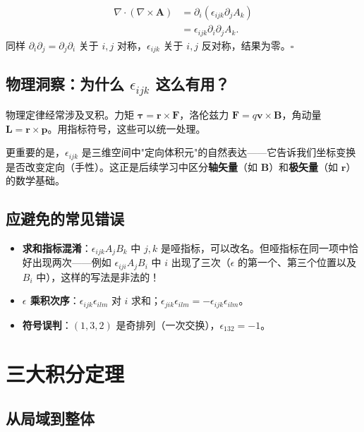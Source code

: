 \begin{example}[证明 $\nabla\cdot(\nabla\times\mathbf{A}) = 0$]
\begin{align*}
\nabla\cdot(\nabla\times\mathbf{A})
&= \partial_i(\epsilon_{ijk}\partial_j A_k) \\
&= \epsilon_{ijk}\partial_i\partial_j A_k.
\end{align*}
同样 $\partial_i\partial_j = \partial_j\partial_i$ 关于 $i,j$ 对称，$\epsilon_{ijk}$ 关于 $i,j$ 反对称，结果为零。$\square$
\end{example}

\subsection{物理洞察：为什么 \texorpdfstring{$\epsilon_{ijk}$}{εijk} 这么有用？}

物理定律经常涉及叉积。力矩 $\bm{\tau} = \mathbf{r}\times\mathbf{F}$，洛伦兹力 $\mathbf{F}=q\mathbf{v}\times\mathbf{B}$，角动量 $\mathbf{L} = \mathbf{r}\times\mathbf{p}$。用指标符号，这些可以统一处理。

更重要的是，$\epsilon_{ijk}$ 是三维空间中"定向体积元"的自然表达——它告诉我们坐标变换是否改变定向（手性）。这正是后续学习中区分\textbf{轴矢量}（如 $\mathbf{B}$）和\textbf{极矢量}（如 $\mathbf{r}$）的数学基础。

\subsection{应避免的常见错误}

\begin{itemize}
  \item \textbf{求和指标混淆}：$\epsilon_{ijk}A_jB_k$ 中 $j,k$ 是哑指标，可以改名。但哑指标在同一项中恰好出现两次——例如 $\epsilon_{iji}A_jB_i$ 中 $i$ 出现了三次（$\epsilon$ 的第一个、第三个位置以及 $B_i$ 中），这样的写法是非法的！
  \item \textbf{$\epsilon$ 乘积次序}：$\epsilon_{ijk}\epsilon_{ilm}$ 对 $i$ 求和；$\epsilon_{jik}\epsilon_{ilm} = -\epsilon_{ijk}\epsilon_{ilm}$。
  \item \textbf{符号误判}：$(1,3,2)$ 是奇排列（一次交换），$\epsilon_{132} = -1$。
\end{itemize}

\section{三大积分定理}

\subsection{从局域到整体}

